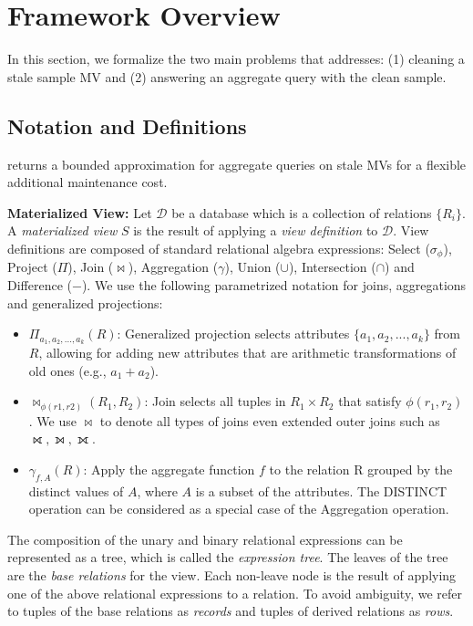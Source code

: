 
\section{Framework Overview}\label{sec-arch}
In this section, we formalize the two main problems that \svc addresses: (1) cleaning a stale sample MV and (2) answering an aggregate query with the clean sample.

\subsection{Notation and Definitions}\label{notation}
\svc returns a bounded approximation for aggregate queries on stale MVs for a flexible additional maintenance cost.

\noindent \textbf{Materialized View:} Let $\mathcal{D}$ be a database which is a collection of relations $\{R_i\}$. A \emph{materialized view} $S$ is the result of applying a \emph{view definition} to $\mathcal{D}$. 
View definitions are composed of standard relational algebra expressions: Select ($\sigma_{\phi}$), Project ($\Pi$), Join ($\bowtie$), Aggregation ($\gamma$), Union ($\cup$), Intersection ($\cap$) and Difference ($-$). 
We use the following parametrized notation for joins, aggregations and generalized projections:
\begin{itemize}[noitemsep] \sloppy
	\item $\Pi_{a_1,a_2,...,a_k}(R)$: Generalized projection selects attributes $\{a_1,a_2,...,a_k\}$ from $R$, allowing for adding new attributes that are arithmetic transformations of old ones (e.g., $a_1+a_2$).
	\item $\bowtie_{\phi (r1,r2)}(R_1,R_2)$: Join selects all tuples in $R_1 \times R_2$ that satisfy $\phi (r_1,r_2)$. We use $\bowtie$ to denote all types of joins even extended outer joins such as $\rightouterjoin,\leftouterjoin,\fullouterjoin$.
	\item $\gamma_{f,A}(R)$: Apply the aggregate function $f$ to the relation R grouped by the distinct values of $A$, where $A$ is a subset of the attributes.  
	The DISTINCT operation can be considered as a special case of the Aggregation operation. 
\end{itemize}
The composition of the unary and binary relational expressions can be represented as a tree, which is called the \emph{expression tree}.
The leaves of the tree are the \emph{base relations} for the view. 
Each non-leave node is the result of applying one of the above relational expressions to a relation.
To avoid ambiguity, we refer to tuples of the base relations as \emph{records} and tuples of derived relations as \emph{rows}.

